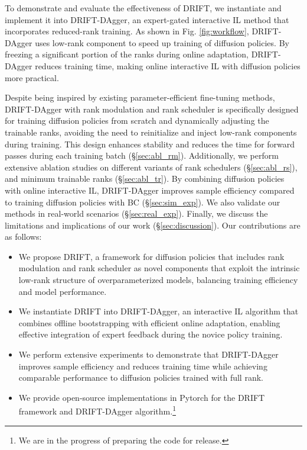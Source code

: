 To demonstrate and evaluate the effectiveness of DRIFT, we instantiate and implement it into DRIFT-DAgger, an expert-gated interactive IL method that incorporates reduced-rank training. As shown in Fig. \ref{fig:workflow}, DRIFT-DAgger uses low-rank component to speed up training of diffusion policies. By freezing a significant portion of the ranks during online adaptation, DRIFT-DAgger reduces training time, making online interactive IL with diffusion policies more practical.

Despite being inspired by existing parameter-efficient fine-tuning methods, DRIFT-DAgger with rank modulation and rank scheduler is specifically designed for training diffusion policies from scratch and dynamically adjusting the trainable ranks, avoiding the need to reinitialize and inject low-rank components during training. This design enhances stability and reduces the time for forward passes during each training batch (\S\ref{sec:abl_rm}). Additionally, we perform extensive ablation studies on different variants of rank schedulers (\S\ref{sec:abl_rs}), and minimum trainable ranks (\S\ref{sec:abl_tr}). By combining diffusion policies with online interactive IL, DRIFT-DAgger improves sample efficiency compared to training diffusion policies with BC (\S\ref{sec:sim_exp}). We also validate our methods in real-world scenarios (\S\ref{sec:real_exp}). Finally, we discuss the limitations and implications of our work (\S\ref{sec:discussion}). Our contributions are as follows:
\begin{itemize}
    \item We propose DRIFT, a framework for diffusion policies that includes rank modulation and rank scheduler as novel components that exploit the intrinsic low-rank structure of overparameterized models, balancing training efficiency and model performance.
    \item We instantiate DRIFT into DRIFT-DAgger, an interactive IL algorithm that combines offline bootstrapping with efficient online adaptation, enabling effective integration of expert feedback during the novice policy training.
    \item We perform extensive experiments to demonstrate that DRIFT-DAgger improves sample efficiency and reduces training time while achieving comparable performance to diffusion policies trained with full rank.
    \item We provide open-source implementations in Pytorch for the DRIFT framework and DRIFT-DAgger algorithm.\footnote{We are in the progress of preparing the code for release.} 
\end{itemize}


